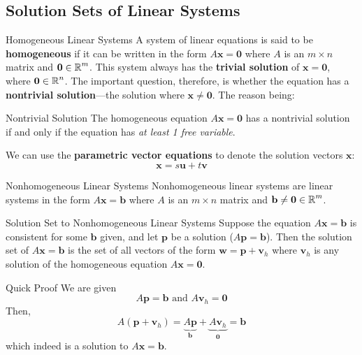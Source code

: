 \documentclass{article}
\begin{document}
\subsection{Solution Sets of Linear Systems}

\begin{definition}{Homogeneous Linear Systems}
	A system of linear equations is said to be \textbf{homogeneous} if it can be written in the form $A\mathbf{x} = \mathbf{0}$ where $A$ is an $m \times n$ matrix and $\mathbf{0} \in \operatorname{\mathbb{R}}^m$. This system always has the \textbf{trivial solution} of $\mathbf{x} = \mathbf{0}$, where $\mathbf{0} \in \operatorname{\mathbb{R}}^n$. The important question, therefore, is whether the equation has a \textbf{nontrivial solution}---the solution where $\mathbf{x} \neq \mathbf{0}$. The reason being:

	\begin{info}{Nontrivial Solution}
		The homogeneous equation $A\mathbf{x} = \mathbf{0}$ has a nontrivial solution if and only if the equation has \emph{at least 1 free variable}.
	\end{info}
\end{definition}

We can use the \textbf{parametric vector equations} to denote the solution vectors $\mathbf{x}$:
$$
	\mathbf{x}= s\mathbf{u} + t\mathbf{v}
$$

\begin{definition}{Nonhomogeneous Linear Systems}
	Nonhomogeneous linear systems are linear systems in the form $A\mathbf{x} = \mathbf{b}$ where $A$ is an $m \times n$ matrix and $\mathbf{b} \neq \mathbf{0} \in \operatorname{\mathbb{R}}^m$.
\end{definition}

\begin{theorem}{Solution Set to Nonhomogeneous Linear Systems}
	Suppose the equation $A\mathbf{x} = \mathbf{b}$ is consistent for some $\mathbf{b}$ given, and let $\mathbf{p}$ be a solution ($A\mathbf{p} = \mathbf{b}$). Then the solution set of $A\mathbf{x} = \mathbf{b}$ is the set of all vectors of the form $\mathbf{w} = \mathbf{p} + \mathbf{v}_h$ where $\mathbf{v}_h$ is any solution of the homogeneous equation $A\mathbf{x} = \mathbf{0}$.

	\begin{boxcontainer}{Quick Proof}
		We are given
		$$
			A\mathbf{p} = \mathbf{b} \text{ and } A\mathbf{v}_h = \mathbf{0}
		$$
		Then,
		$$
			A\left( \mathbf{p} + \mathbf{v}_h \right) = \underbrace{A\mathbf{p}}_{\mathbf{b}} + \underbrace{A\mathbf{v}_h}_{\mathbf{0}} = \mathbf{b}
		$$
		which indeed is a solution to $A\mathbf{x} = \mathbf{b}$.
	\end{boxcontainer}
\end{theorem}
\end{document}
